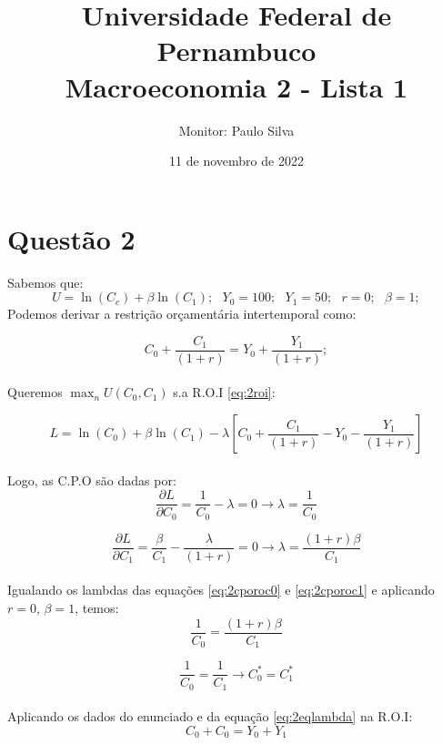 \documentclass{article}
\title{Universidade Federal de Pernambuco \\
Macroeconomia 2 - Lista 1}
\author{Monitor: Paulo Silva}
\date{11 de novembro de 2022}
\begin{document}
\maketitle %


\section*{Questão 2}
Sabemos que: $$U = \ln(C_c) + \beta \ln(C_1); \>\>\> 
Y_0 = 100; \>\>\>
Y_1 = 50; \>\>\>
r = 0; \>\>\>
\beta = 1; $$
Podemos derivar a restrição orçamentária intertemporal como:

\begin{equation}\label{eq:2roi}
    C_0 + \frac{C_1}{(1+r)} = Y_0 + \frac{ Y_1}{(1+r)};
\end{equation}
\\
Queremos $\max_{n} U(C_0,C_1)$ s.a R.O.I \eqref{eq:2roi}:

\begin{equation}
    L = \ln(C_0)+\beta\ln(C_1)-\lambda\left[ C_0+\frac{C_1}{(1+r)}-Y_0-\frac{Y_1}{(1+r)}  \right]
\end{equation}
\\
Logo, as C.P.O são dadas por:
\begin{equation}\label{eq:2cporoc0}
    \frac{\partial L}{\partial C_0} = \frac{1}{C_0} - \lambda=0 \to \lambda = \frac{1}{C_0}
\end{equation}

\begin{equation}\label{eq:2cporoc1}
    \frac{\partial L}{\partial C_1} = \frac{\beta}{C_1}-\frac{\lambda}{(1+r)}=0 \to \lambda = \frac{(1+r)\beta}{C_1}
\end{equation}
\\
Igualando os lambdas das equações \eqref{eq:2cporoc0} e \eqref{eq:2cporoc1} e aplicando $r=0$, $\beta=1$, temos:
\begin{equation}\label{eq:2eqlambda}
    \frac{1}{C_0} = \frac{(1+r)\beta}{C_1}
\end{equation}

\begin{equation}
    \frac{1}{C_0} = \frac{1}{C_1} \to C_0^* = C_1^*
\end{equation}
\\
Aplicando os dados do enunciado e da equação \eqref{eq:2eqlambda} na R.O.I:
\begin{equation}
    C_0 + C_0 = Y_0 + Y_1
\end{equation}
\end{document}

